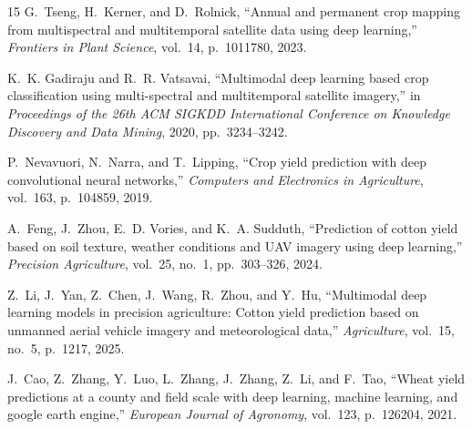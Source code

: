 \documentclass[conference]{IEEEtran}
\begin{document}
\begin{thebibliography}{15}
G.~Tseng, H.~Kerner, and D.~Rolnick, ``Annual and permanent crop mapping from multispectral and multitemporal satellite data using deep learning,'' \textit{Frontiers in Plant Science}, vol.~14, p.~1011780, 2023.

K.~K. Gadiraju and R.~R. Vatsavai, ``Multimodal deep learning based crop classification using multi-spectral and multitemporal satellite imagery,'' in \textit{Proceedings of the 26th ACM SIGKDD International Conference on Knowledge Discovery and Data Mining}, 2020, pp.~3234--3242.

P.~Nevavuori, N.~Narra, and T.~Lipping, ``Crop yield prediction with deep convolutional neural networks,'' \textit{Computers and Electronics in Agriculture}, vol.~163, p.~104859, 2019.

A.~Feng, J.~Zhou, E.~D. Vories, and K.~A. Sudduth, ``Prediction of cotton yield based on soil texture, weather conditions and UAV imagery using deep learning,'' \textit{Precision Agriculture}, vol.~25, no.~1, pp.~303--326, 2024.

Z.~Li, J.~Yan, Z.~Chen, J.~Wang, R.~Zhou, and Y.~Hu, ``Multimodal deep learning models in precision agriculture: Cotton yield prediction based on unmanned aerial vehicle imagery and meteorological data,'' \textit{Agriculture}, vol.~15, no.~5, p.~1217, 2025.

J.~Cao, Z.~Zhang, Y.~Luo, L.~Zhang, J.~Zhang, Z.~Li, and F.~Tao, ``Wheat yield predictions at a county and field scale with deep learning, machine learning, and google earth engine,'' \textit{European Journal of Agronomy}, vol.~123, p.~126204, 2021.

\end{thebibliography}
\end{document}
